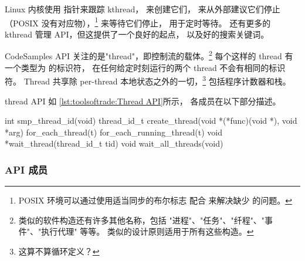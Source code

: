 Linux 内核使用
 指针来跟踪 kthread，
 来创建它们，
 来从外部建议它们停止
（POSIX 没有对应物），\footnote{
	POSIX 环境可以通过使用适当同步的布尔标志
	配合  来解决缺少
	 的问题。}
 来等待它们停止，
 用于定时等待。
还有更多的 kthread 管理 API，但这提供了一个良好的起点，
以及好的搜索关键词。

CodeSamples API 关注的是"thread"，即控制流的载体。\footnote{
	类似的软件构造还有许多其他名称，包括
	"进程"、"任务"、"纤程"、"事件"、"执行代理"
	等等。
	类似的设计原则适用于所有这些构造。}
每个这样的 thread 有一个类型为  的标识符，
在任何给定时刻运行的两个 thread 不会有相同的标识符。
Thread 共享除 per-thread 本地状态之外的一切，\footnote{
	这算不算循环定义？}
包括程序计数器和栈。

thread API 如
\cref{lst:toolsoftrade:Thread API}所示，
各成员在以下部分描述。

\begin{listing}
\begin{VerbatimL}[numbers=none,xleftmargin=2pt]
int smp_thread_id(void)
thread_id_t create_thread(void *(*func)(void *), void *arg)
for_each_thread(t)
for_each_running_thread(t)
void *wait_thread(thread_id_t tid)
void wait_all_threads(void)
\end{VerbatimL}
\caption{Thread API 接口}
\label{lst:toolsoftrade:Thread API}
\end{listing}

\subsubsection{API 成员}

